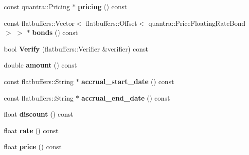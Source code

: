\begin{DoxyCompactItemize}
\mbox{\label{structquantra_1_1FLATBUFFERS__FINAL__CLASS_a8e72b9cbbc3759570f15f834326dc962}} 
const quantra\+::\+Pricing $\ast$ {\bfseries pricing} () const
\item 
\mbox{\label{structquantra_1_1FLATBUFFERS__FINAL__CLASS_a92286901d4ca5024d7bf293453adac9a}} 
const flatbuffers\+::\+Vector$<$ flatbuffers\+::\+Offset$<$ quantra\+::\+Price\+Floating\+Rate\+Bond $>$ $>$ $\ast$ {\bfseries bonds} () const
\item 
\mbox{\label{structquantra_1_1FLATBUFFERS__FINAL__CLASS_aed693ee5a45b5f53af7411f9cab6793a}} 
bool {\bfseries Verify} (flatbuffers\+::\+Verifier \&verifier) const
\item 
\mbox{\label{structquantra_1_1FLATBUFFERS__FINAL__CLASS_a166da80825220ec9e04580d3aba13aca}} 
double {\bfseries amount} () const
\item 
\mbox{\label{structquantra_1_1FLATBUFFERS__FINAL__CLASS_add6840ddd841ee55494f311eb59a6af6}} 
const flatbuffers\+::\+String $\ast$ {\bfseries accrual\+\_\+start\+\_\+date} () const
\item 
\mbox{\label{structquantra_1_1FLATBUFFERS__FINAL__CLASS_a9d0add6a4e2e5f6895c03c992fe74485}} 
const flatbuffers\+::\+String $\ast$ {\bfseries accrual\+\_\+end\+\_\+date} () const
\item 
\mbox{\label{structquantra_1_1FLATBUFFERS__FINAL__CLASS_aecb95f6e465c3d9921a452b43fade4ed}} 
float {\bfseries discount} () const
\item 
\mbox{\label{structquantra_1_1FLATBUFFERS__FINAL__CLASS_aa5a25f3bfb8a4b4822cb5fcb1b479ff8}} 
float {\bfseries rate} () const
\item 
\mbox{\label{structquantra_1_1FLATBUFFERS__FINAL__CLASS_afbd77034b48d3fee2f27dad0ac3503f1}} 
float {\bfseries price} () const

\end{DoxyCompactItemize}
